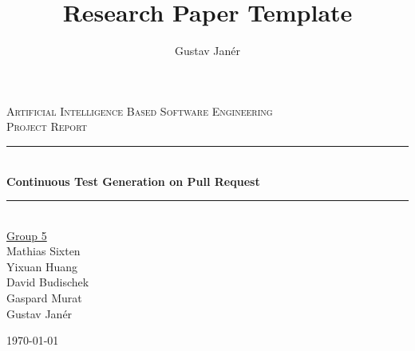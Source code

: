 \documentclass[12pt, a4paper]{article}
\title{Research Paper Template} %
\author{Gustav Janér}  %
\newcommand{\HRule}{\rule{\linewidth}{0.5mm}} %
\begin{document}
\begin{titlepage} 
\center 	     %


\textsc{\LARGE Artificial Intelligence Based Software Engineering} \\[1cm]

\textsc{\Large Project Report}\\[0.5cm]


\HRule \\[0.4cm]
{ \huge \bfseries Continuous Test Generation on Pull Request}\\[0.03cm] %
\HRule \\[1.5cm]
 

{\Large \underline{Group 5} \\
Mathias Sixten \\
Yixuan Huang  \\
David Budischek  \\
Gaspard Murat \\
Gustav Janér \\
} %

\vspace{0.3cm}
\today
\vspace{4cm}



\end{titlepage}
\end{document}
